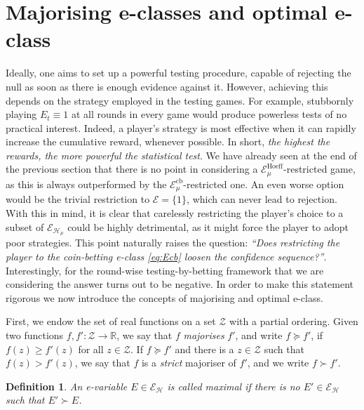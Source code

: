 \documentclass[3p, authoryear, 10pt]{elsarticle}%
\newcommand{\Ecb}{\mathcal E^{\mathrm{cb}}}
\newcommand{\Ee}{\mathcal E}
\newcommand{\EH}{\mathcal E^{\mathrm{Hoeff}}}
\newcommand{\Hh}{\mathcal H}
\newcommand{\R}{\mathbb R}
\newcommand{\Z}{\mathcal Z}
\newtheorem{definition}{Definition}
\begin{document}
\section{Majorising e-classes and optimal e-class}
Ideally, one aims to set up a powerful testing procedure, capable of rejecting the null as soon as there is enough evidence against it. However, achieving this depends on the strategy employed in the testing games. For example, stubbornly playing $E_t \equiv 1$ at all rounds in every game would produce powerless tests of no practical interest. Indeed, a player's strategy is most effective when it can rapidly increase the cumulative reward, whenever possible. In short, \emph{the highest the rewards, the more powerful the statistical test}. We have already seen at the end of the previous section that there is no point in considering a $\EH_\mu$-restricted game, as this is always outperformed by the $\Ecb_\mu$-restricted one. An even worse option would be the trivial restriction to $\Ee=\{1\}$, which can never lead to rejection. With this in mind, it is clear that carelessly restricting the player's choice to a subset  of $\Ee_{\Hh_\mu}$ could be highly detrimental, as it might force the player to adopt poor strategies. This point naturally raises the question: \emph{``Does restricting the player to the coin-betting e-class \eqref{eq:Ecb} loosen the confidence sequence?''}. Interestingly, for the round-wise testing-by-betting framework that we are considering the answer turns out to be negative. In order to make this statement rigorous we now introduce the concepts of majorising and optimal e-class.

First, we endow the set of real functions on a set $\Z$ with a partial ordering. Given two functions $f, f':\Z\to\R$, we say that $f$ \emph{majorises} $f'$, and write $f\succeq f'$, if $f(z)\geq f'(z)$ for all $z\in\Z$. If $f\succeq f'$ and there is a $z\in\Z$ such that $f(z)>f'(z)$, we say that $f$ is a \emph{strict} majoriser of $f'$, and we write $f\succ f'$. 

\begin{definition}An e-variable $E\in\Ee_\Hh$ is called   \emph{maximal} if there is no $E'\in\Ee_\Hh$ such that $E'\succ E$.
\end{definition}
\end{document}
